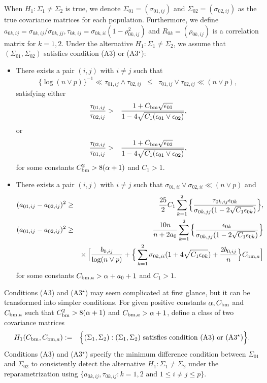 \documentclass[11pt]{article}
\newcommand{\bea}{\begin{eqnarray*}}
\newcommand{\eea}{\end{eqnarray*}}
\newcommand{\bean}{\begin{eqnarray}}
\newcommand{\eean}{\end{eqnarray}}
\newcommand{\sg}{\Sigma}
\begin{document}
When $H_1:\sg_1\neq \sg_2$ is true, we denote $\sg_{01}=(\sigma_{01,ij})$ and $\sg_{02}=(\sigma_{02,ij})$ as the true covariance matrices for each population.
Furthermore, we define $a_{0k,ij} = \sigma_{0k,ij}/\sigma_{0k,jj}, \tau_{0k,ij}= \sigma_{0k,ii}(1- \rho_{0k,ij}^2)$ and $R_{0k}=(\rho_{0k,ij})$ is a correlation matrix for $k=1,2$.
Under the alternative $H_1:\sg_1\neq \sg_2$, we assume that $(\sg_{01}, \sg_{02})$ satisfies condition (A3) or (A3$^\star$):
\begin{itemize}
	\item[(A3)] 
	There exists a pair $(i,j)$ with $i\neq j$ such that
	\bea
	\{\log (n\vee p)\}^{-1} \ll \tau_{01,ij}\wedge \tau_{02,ij} &\le& \tau_{01,ij}\vee \tau_{02,ij} \ll (n\vee p),
	\eea
	satisfying either
	\bea
	\frac{\tau_{01,ij}}{\tau_{02,ij}} &>&  \frac{1+ C_{\rm bm}\sqrt{\epsilon_{01}}}{1- 4 \sqrt{C_1(\epsilon_{01}\vee \epsilon_{02})}},
	\eea
	or 
	\bea
	\frac{\tau_{02,ij}}{\tau_{01,ij}} &>&  \frac{1+ C_{\rm bm}\sqrt{\epsilon_{02}} }{1- 4 \sqrt{C_1(\epsilon_{01}\vee \epsilon_{02})}},
	\eea 
	for some constants $C_{\rm bm}^2 > 8 (\alpha+1)$ and $C_1>1$.
	
	\item[(A3$^\star$)] There exists a pair $(i,j)$ with $i\neq j$ such that $\sigma_{01,ii} \vee \sigma_{02,ii} \ll (n\vee p)$ and
	\bean
	(a_{01,ij} - a_{02,ij})^2 &\ge& \frac{25}{2} C_1 \sum_{k=1}^2 \Big\{\frac{\tau_{0k,ij}\epsilon_{0k} }{\sigma_{0k,jj}(1-2\sqrt{C_1 \epsilon_{0k}}) }  \Big\} ,  \label{diff_aij1} \\
	(a_{01,ij} - a_{02,ij})^2 &\ge& \frac{10n}{n+2a_0} \sum_{k=1}^2 \Big\{ \frac{\epsilon_{0k}}{ \sigma_{0k,jj}  (1-2\sqrt{C_1\epsilon_{0k}}) }  \Big\} \label{diff_aij2} \\
	&&\times\, \Big[ \frac{b_{0,ij}}{\log (n\vee p)} + \Big\{ \sum_{k=1}^2 \sigma_{0k,ii}(1+4\sqrt{C_1\epsilon_{0k}}) + \frac{2 b_{0,ij}}{n} \Big\} C_{{\rm bm}, a}   \Big] \nonumber
	\eean
	for some constants $C_{{\rm bm}, a} > \alpha + a_0 +1$ and $C_1>1$.
\end{itemize}
Conditions (A3) and (A3$^\star$) may seem complicated at first glance, but it can be transformed into simpler conditions.
For given positive constants $\alpha, C_{\rm bm}$ and $C_{{\rm bm},a}$ such that $C_{\rm bm}^2>8(\alpha+1)$ and $C_{{\rm bm},a}>\alpha+1$, define a class of two covariance matrices
\bea
{H}_1(C_{\rm bm}, C_{{\rm bm},a})   &:=& \Big\{ (\sg_1,\sg_2) : (\sg_1,\sg_2) \text{ satisfies condition (A3) or (A3$^\star$)}  \Big\} .
\eea
Conditions (A3) and (A3$^\star$) specify the minimum difference condition between $\sg_{01}$ and $\sg_{02}$ to consistently detect the alternative $H_1:\sg_1\neq \sg_2$  under the reparametrization using $\{a_{0k,ij},\tau_{0k,ij}: k=1,2 \text{ and } 1\le i\neq j \le p \}$.
\end{document}
